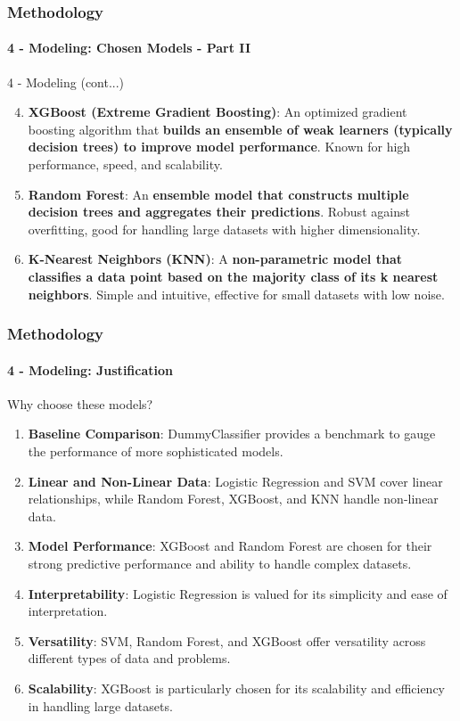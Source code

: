 \begin{frame}
	\frametitle{Methodology}
	\framesubtitle{4 - Modeling: Chosen Models - Part II}	
	\begin{block}{4 - Modeling (cont...)} 
		\begin{enumerate}
			\setcounter{enumi}{3}
			\item \textbf{XGBoost (Extreme Gradient Boosting)}: An optimized gradient boosting algorithm that \textbf{builds an ensemble of weak learners (typically decision trees) to improve model performance}. Known for high performance, speed, and scalability.
			
			\item \textbf{Random Forest}: An \textbf{ensemble model that constructs multiple decision trees and aggregates their predictions}. Robust against overfitting, good for handling large datasets with higher dimensionality.
			
			\item \textbf{K-Nearest Neighbors (KNN)}: A \textbf{non-parametric model that classifies a data point based on the majority class of its k nearest neighbors}. Simple and intuitive, effective for small datasets with low noise.
		\end{enumerate}
	\end{block}
\end{frame}
\begin{frame}
	\frametitle{Methodology}
	\framesubtitle{4 - Modeling: Justification}	
	\begin{alertblock}{Why choose these models?} 
		\begin{enumerate}
			\scriptsize
			\item \textbf{Baseline Comparison}: DummyClassifier provides a benchmark to gauge the performance of more sophisticated models.

			\item \textbf{Linear and Non-Linear Data}: Logistic Regression and SVM cover linear relationships, while Random Forest, XGBoost, and KNN handle non-linear data.

			\item \textbf{Model Performance}: XGBoost and Random Forest are chosen for their strong predictive performance and ability to handle complex datasets.

			\item \textbf{Interpretability}: Logistic Regression is valued for its simplicity and ease of interpretation.

			\item \textbf{Versatility}: SVM, Random Forest, and XGBoost offer versatility across different types of data and problems.

			\item \textbf{Scalability}: XGBoost is particularly chosen for its scalability and efficiency in handling large datasets.




		\end{enumerate}
	\end{alertblock}
\end{frame}



